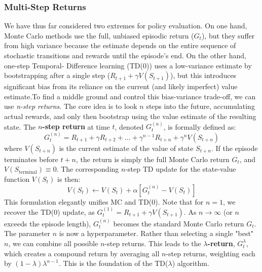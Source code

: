   \subsubsection{Multi-Step Returns}
  We have thus far considered two extremes for policy evaluation. On one hand, Monte Carlo methods use the full,
  unbiased episodic return ($G_t$), but they suffer from high variance because the estimate depends on the entire
  sequence of stochastic transitions and rewards until the episode's end. On the other hand, one-step Temporal-
  Difference learning (TD(0)) uses a low-variance estimate by bootstrapping after a single step 
  ($R_{t+1} + \gamma V(S_{t+1})$), but this introduces significant bias from its reliance on the current (and
  likely imperfect) value estimate.\newline To find a middle ground and control this bias-variance trade-off,
  we can use \textit{n-step returns}. The core idea is to look $n$ steps into the future, accumulating actual rewards,
  and only then bootstrap using the value estimate of the resulting state. The \textbf{$n$-step return} at time $t$, 
  denoted $G_t^{(n)}$, is formally defined as:
  $$
  G_t^{(n)} = R_{t+1} + \gamma R_{t+2} + \dots + \gamma^{n-1} R_{t+n} + \gamma^n V(S_{t+n})
  $$
  where $V(S_{t+n})$ is the current estimate of the value of state $S_{t+n}$. If the episode terminates before 
  $t+n$, the return is simply the full Monte Carlo return $G_t$, and $V(S_{\text{terminal}}) \equiv 0$. The 
  corresponding $n$-step TD update for the state-value function $V(S_t)$ is then:
  $$
  V(S_t) \leftarrow V(S_t) + \alpha \left[ G_t^{(n)} - V(S_t) \right]
  $$
  This formulation elegantly unifies MC and TD(0). Note that for $n=1$, we recover the TD(0) update, as 
  $G_t^{(1)} = R_{t+1} + \gamma V(S_{t+1})$. As $n \to \infty$ (or $n$ exceeds the episode length), $G_t^{(n)}$ 
  becomes the standard Monte Carlo return $G_t$. The parameter $n$ is now a hyperparameter. Rather than selecting
  a single "best" $n$, we can combine all possible $n$-step returns. This leads to the \textbf{$\lambda$-return},
  $G_t^\lambda$, which creates a compound return by averaging all $n$-step returns, weighting each by 
  $(1-\lambda)\lambda^{n-1}$. This is the foundation of the TD($\lambda$) algorithm.
